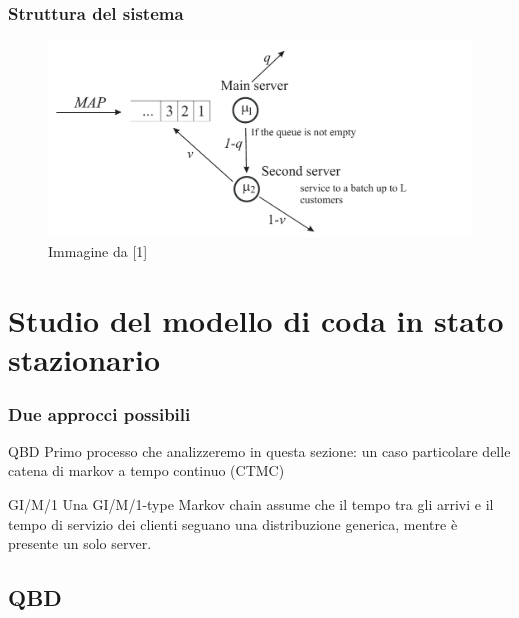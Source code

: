 \documentclass{beamer}
\begin{document}
\begin{frame}
    \frametitle{Struttura del sistema}
    \begin{figure}[h]
        \centering
        \includegraphics[width=\textwidth]{hVQg024.png}
        \caption{Immagine da [1]}
        \label{fig:diagramma_di_stato}
    \end{figure}
\end{frame}


\section{Studio del modello di coda in stato stazionario}


\begin{frame}
    \frametitle{Due approcci possibili}
    \begin{block}{QBD}
        Primo processo che analizzeremo in  questa sezione: un caso particolare delle catena di markov a tempo continuo (CTMC)
    \end{block}
    \begin{block}{GI/M/1}
        Una GI/M/1-type Markov chain assume che il tempo tra gli arrivi e il tempo di servizio dei clienti seguano una distribuzione generica, mentre è presente un solo server.
    \end{block}
\end{frame}


\subsection{QBD}


\end{document}
